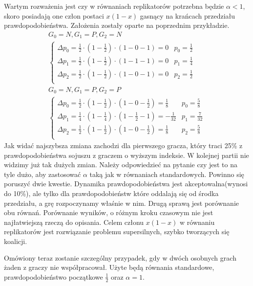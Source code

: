 Wartym rozważenia jest czy w równaniach replikatorów potrzebna będzie $\alpha < 1$, skoro posiadają one człon postaci $x(1-x)$ gasnący na krańcach przedziału prawdopodobieństwa. Założenia zostały oparte na poprzednim przykładzie.
\begin{gather*}
G_0 = N, G_1 = P, G_2 = N \\
\left\{
\begin{array}{ll}
\Delta p_0 = \frac{1}{2} \cdot (1 - \frac{1}{2}) \cdot (1 - 0 - 1) =  0 & p_0=\frac{1}{2}\\
\Delta p_1 = \frac{1}{2} \cdot (1 - \frac{1}{2}) \cdot (1 - 1 - 1) =  0 & p_1= \frac{1}{4}\\
\Delta p_2 = \frac{1}{2} \cdot (1 - \frac{1}{2}) \cdot (1 - 0 - 1) =  0 & p_2=\frac{1}{2}\\
\end{array} 
\right.
\\
G_0 = N, G_1 = P, G_2 = P \\
\left\{
\begin{array}{ll}
\Delta p_0 = \frac{1}{2} \cdot (1 - \frac{1}{2}) \cdot (1 - 0 - \frac{1}{2}) = \frac{1}{8} & p_0=\frac{5}{8}\\
\Delta p_1 = \frac{1}{4} \cdot (1 - \frac{1}{4}) \cdot (1 - \frac{1}{2} - 1) = -\frac{1}{32} & p_1= \frac{7}{32}\\
\Delta p_2 = \frac{1}{2} \cdot (1 - \frac{1}{2}) \cdot (1 - 0 - \frac{1}{2}) = \frac{1}{8}  & p_2=\frac{5}{8}\\
\end{array}
\right.
\end{gather*}
Jak widać najszybsza zmiana zachodzi dla pierwszego gracza, który traci 25\% z prawdopodobieństwa sojuszu z graczem o wyższym indeksie. W kolejnej partii nie widzimy już tak dużych zmian. Należy odpowiedzieć na pytanie czy jest to na tyle dużo, aby zastosować $\alpha$ taką jak w równaniach standardowych. Powinno się poruszyć dwie kwestie. Dynamika prawdopodobieństwa jest akceptowalna(wynosi do 10\%), ale tylko dla prawdopodobieństw które oddalają się od środka przedziału, a grę rozpoczynamy właśnie w nim. Drugą sprawą jest porównanie obu równań. Porównanie wyników, o różnym kroku czasowym nie jest najłatwiejszą rzeczą do opisania. Celem członu $x(1-x)$ w równaniu replikatorów jest rozwiązanie problemu supersilnych, szybko tworzących się koalicji.


Omówiony teraz zostanie szczególny przypadek, gdy w dwóch osobnych grach żaden z graczy nie współpracował. Użyte będą równania standardowe, prawdopodobieństwo początkowe $\frac{1}{2}$ oraz $\alpha = 1$.

